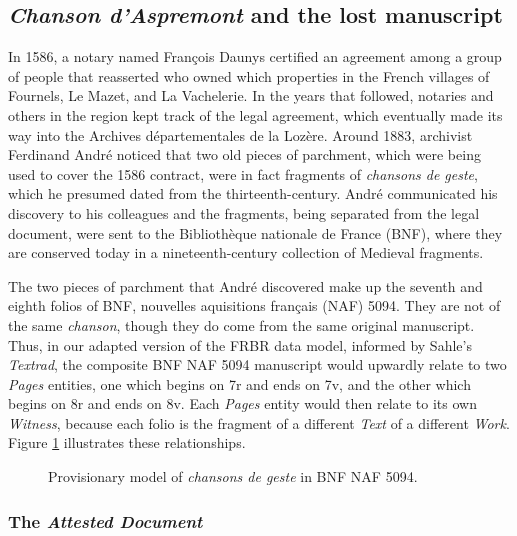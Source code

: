 \subsection{\textit{Chanson d'Aspremont} and the lost manuscript}

In 1586, a notary named François Daunys certified an agreement among a group of people that reasserted who owned which properties in the French villages of Fournels, Le Mazet, and La Vachelerie. In the years that followed, notaries and others in the region kept track of the legal agreement, which eventually made its way into the Archives départementales de la Lozère. Around 1883, archivist Ferdinand André noticed that two old pieces of parchment, which were being used to cover the 1586 contract, were in fact fragments of \textit{chansons de geste}, which he presumed dated from the thirteenth-century. André communicated his discovery to his colleagues and the fragments, being separated from the legal document, were sent to the Bibliothèque nationale de France (BNF), where they are conserved today in a nineteenth-century collection of Medieval fragments.

The two pieces of parchment that André discovered make up the seventh and eighth folios of BNF, nouvelles aquisitions français (NAF) 5094. They are not of the same \textit{chanson}, though they do come from the same original manuscript. Thus, in our adapted version of the FRBR data model, informed by Sahle's \textit{Textrad}, the composite BNF NAF 5094 manuscript would upwardly relate to two \textit{Pages} entities, one which begins on 7r and ends on 7v, and the other which begins on 8r and ends on 8v. Each \textit{Pages} entity would then relate to its own \textit{Witness}, because each folio is the fragment of a different \textit{Text} of a different \textit{Work}. Figure \ref{fig:BNFNAF5094} illustrates these relationships.

\begin{figure}[ht]
    \begin{center}
        
    \end{center}
    \caption{Provisionary model of \textit{chansons de geste} in BNF NAF 5094.}
    \label{fig:BNFNAF5094}
\end{figure}

\subsubsection{The \textit{Attested Document}}

